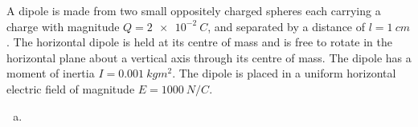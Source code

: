 \question A dipole is made from two small oppositely charged spheres each carrying a charge with magnitude $Q=\SI{2e-2}{C}$, and separated by a distance of $l=\SI{1}{cm}$. The horizontal dipole is held at its centre of mass and is free to rotate in the horizontal plane about a vertical axis through its centre of mass. The dipole has a moment of inertia $I=\SI{0.001}{kgm^2}$. The dipole is placed in a uniform horizontal electric field of magnitude $E=\SI{1000}{N/C}$.
\begin{finalanswer}
\begin{enumerate}[(a)]
\item
\end{enumerate}
\end{finalanswer}
